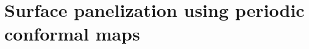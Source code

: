 \documentclass[Thesis.tex]{subfiles}
\begin{document}
\chapter{Surface panelization using periodic conformal maps}

\def\subfilebibliography{}









\subfilebibliographytwo
\end{document}
